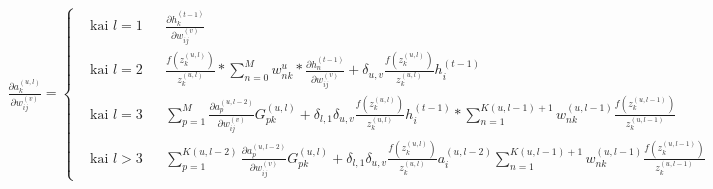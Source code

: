 \begin{equation} \label{eq:gkvh}
  \begin{aligned}
    \frac{\partial a_k^{(u,l)}}{\partial w_{ij}^{(v)}} = \left \{
    \begin{aligned}
      &\text{kai } l=1 && \frac{\partial h_k^{(t-1)}}{\partial w_{ij}^{(v)}}\\
      &\text{kai } l=2 && \frac{f(z_k^{(u,l)})}{z_k^{(u,l)}}
      *
      \sum_{n=0}^M w_{nk}^u * \frac{\partial h_n^{(t-1)}}{\partial w_{ij}^{(v)}} +
      \delta_{u,v}\frac{f(z_k^{(u,l)})}{z_k^{(u,l)}}h_i^{(t-1)}\\
      &\text{kai } l=3 && \sum_{p=1}^{M}
      \frac{\partial a_p^{(u,l-2)}}{\partial w_{ij}^{(v)}}G_{pk}^{(u,l)} +
      \delta_{l,1}\delta_{u,v}\frac{f(z_k^{(u,l)})}{z_k^{(u,l)}}h_i^{(t-1)}*\sum_{n=1}^{K(u,l-1)+1} w_{nk}^{(u,l-1)}\frac{f(z_k^{(u,l-1)})}{z_k^{(u,l-1)}}\\
      &\text{kai } l>3 && \sum_{p=1}^{K(u,l-2)}
      \frac{\partial a_p^{(u,l-2)}}{\partial w_{ij}^{(v)}}G_{pk}^{(u,l)} +
      \delta_{l,1}\delta_{u,v}\frac{f(z_k^{(u,l)})}{z_k^{(u,l)}}a_i^{(u,l-2)}\sum_{n=1}^{K(u,l-1)+1} w_{nk}^{(u,l-1)}\frac{f(z_k^{(u,l-1)})}{z_k^{(u,l-1)}}
    \end{aligned}
    \right.
  \end{aligned}
\end{equation}
%
%

%
%

%
%

%
%

%
%
